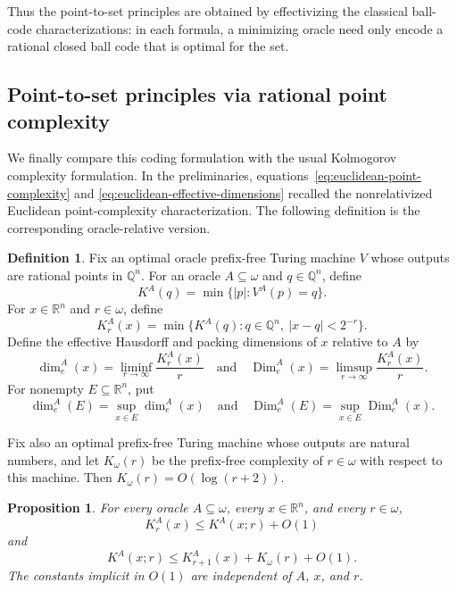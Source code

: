 \documentclass[a4paper,oneside,reqno,12pt]{amsart}
\theoremstyle{plain}
\newtheorem{proposition}[theorem]{Proposition}
\theoremstyle{definition}
\newtheorem{definition}[theorem]{Definition}
\theoremstyle{remark}
\DeclareMathOperator{\Dim}{Dim}
\begin{document}
Thus the point-to-set principles are obtained by effectivizing the classical
ball-code characterizations: in each formula, a minimizing oracle need only
encode a rational closed ball code that is optimal for the set.

\subsection{Point-to-set principles via rational point complexity}
\label{subsec:rational-point-complexity}

We finally compare this coding formulation with the usual Kolmogorov complexity formulation.
In the preliminaries, equations~\eqref{eq:euclidean-point-complexity} and
\eqref{eq:euclidean-effective-dimensions} recalled the nonrelativized
Euclidean point-complexity characterization.
The following definition is the
corresponding oracle-relative version.

\begin{definition}
\label{def:rational-point-dimensions}
Fix an optimal oracle prefix-free Turing machine \(V\) whose outputs are rational
points in \(\mathbb Q^n\).  For an oracle \(A\subseteq\omega\) and
\(q\in\mathbb Q^n\), define
\[
K^A(q)
=
\min\{|p|:V^A(p)=q\}.
\]
For \(x\in\mathbb R^n\) and \(r\in\omega\), define
\[
K^A_r(x)
=
\min\{K^A(q):q\in\mathbb Q^n,\ |x-q|<2^{-r}\}.
\]
Define the effective Hausdorff and packing dimensions of \(x\) relative to
\(A\) by
\[
\dim_e^A(x)
=
\liminf_{r\to\infty}\frac{K^A_r(x)}{r}
\quad\text{and}\quad
\Dim_e^A(x)
=
\limsup_{r\to\infty}\frac{K^A_r(x)}{r}.
\]
For nonempty \(E\subseteq\mathbb R^n\), put
\[
\dim_e^A(E)
=
\sup_{x\in E}\dim_e^A(x)
\quad\text{and}\quad
\Dim_e^A(E)
=
\sup_{x\in E}\Dim_e^A(x).
\]
\end{definition}

Fix also an optimal prefix-free Turing machine whose outputs are natural numbers,
and let \(K_\omega(r)\) be the prefix-free complexity of \(r\in\omega\) with
respect to this machine.  Then \(K_\omega(r)=O(\log(r+2))\).

\begin{proposition}
\label{prop:ball-point-effective-dimensions}
For every oracle \(A\subseteq\omega\), every \(x\in\mathbb R^n\), and every
\(r\in\omega\),
\[
K^A_r(x)\le K^A(x;r)+O(1)
\]
and
\[
K^A(x;r)\le K^A_{r+1}(x)+K_\omega(r)+O(1).
\]
The constants implicit in \(O(1)\) are independent of \(A\), \(x\), and \(r\).
\end{proposition}
\end{document}
